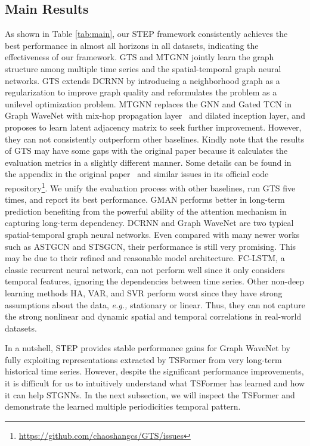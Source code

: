 \documentclass[sigconf]{acmart}
\newcommand{\eg}{\textit{e.g.,}\xspace}
\begin{document}
\subsection{Main Results}
As shown in Table \ref{tab:main}, our STEP framework consistently achieves the best performance in almost all horizons in all datasets, indicating the effectiveness of our framework.
GTS and MTGNN jointly learn the graph structure among multiple time series and the spatial-temporal graph neural networks.
GTS extends DCRNN by introducing a neighborhood graph as a regularization to improve graph quality and reformulates the problem as a unilevel optimization problem. 
MTGNN replaces the GNN and Gated TCN in Graph WaveNet with mix-hop propagation layer~\cite{2019MixHop} and dilated inception layer, and proposes to learn latent adjacency matrix to seek further improvement.
However, they can not consistently outperform other baselines.
Kindly note that the results of GTS may have some gaps with the original paper because it calculates the evaluation metrics in a slightly different manner.
Some details can be found in the appendix in the original paper~\cite{2021GTS} and similar issues in its official code repository\footnote{\url{https://github.com/chaoshangcs/GTS/issues}}.
We unify the evaluation process with other baselines, run GTS five times, and report its best performance.
GMAN performs better in long-term prediction benefiting from the powerful ability of the attention mechanism in capturing long-term dependency.
DCRNN and Graph WaveNet are two typical spatial-temporal graph neural networks. 
Even compared with many newer works such as ASTGCN and STSGCN, their performance is still very promising. 
This may be due to their refined and reasonable model architecture. 
FC-LSTM, a classic recurrent neural network, can not perform well since it only considers temporal features, ignoring the dependencies between time series.
Other non-deep learning methods HA, VAR, and SVR perform worst since they have strong assumptions about the data, \eg stationary or linear. 
Thus, they can not capture the strong nonlinear and dynamic spatial and temporal correlations in real-world datasets.

In a nutshell, STEP provides stable performance gains for Graph WaveNet by fully exploiting representations extracted by TSFormer from very long-term historical time series.
However, despite the significant performance improvements, it is difficult for us to intuitively understand what TSFormer has learned and how it can help STGNNs. 
In the next subsection, we will inspect the TSFormer and demonstrate the learned multiple periodicities temporal pattern.
\end{document}
